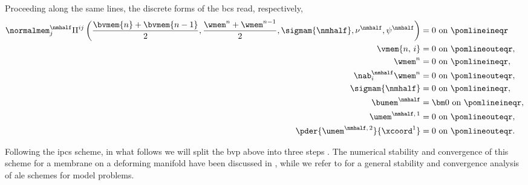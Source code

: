 Proceeding along the same lines, the discrete forms of the \acp{bc} \crefs{\bcsmembrane} read, respectively,
\bw
\begin{align}
    \label{bc_fl_mem_mem_1_disc_bis}
    \normalmem^\nmhalf_j \Pi^{ij}\left( \frac{\bvmem{n} + \bvmem{n-1}}{2},\frac{\wmem^n + \wmem^{n-1}}{2}, \sigmam{\nmhalf}, \nu^\nmhalf, \psi^\nmhalf \right) & = 0 \text{ on } \pomlineineqr        \\
    \label{bc_fl_mem_mem_2_disc_bis}
    \vmem{n, \, i}                                                                                                                                             & = 0 \text{ on } \pomlineouteqr,      \\
    \label{bc_fl_mem_mem_3_disc_bis}
    \wmem^n                                                                                                                                                    & = 0 \text{ on } \pomlineineqr,       \\
    \label{bc_fl_mem_mem_4_disc_bis}
    \nab^\nmhalf_i \wmem^n                                                                                                                                     & = 0 \text{ on } \pomlineouteqr,      \\
    \label{bc_fl_mem_mem_5_disc_bis}
    \sigmam{\nmhalf}                                                                                                                                           & = 0 \text{ on } \pomlineineqr,       \\
    \label{bc_fl_mem_mem_6_disc_bis}
    \bumem^\nmhalf                                                                                                                                             & = {\bm 0} \text{ on } \pomlineineqr, \\
    \label{bc_fl_mem_mem_7_disc_bis}
    \umem^{\nmhalf, \, 1}                                                                                                                                      & = 0 \text{ on } \pomlineouteqr,      \\
    \label{bc_fl_mem_mem_8_disc_bis}
    \pder{\umem^{\nmhalf, \, 2}}{\xcoord^1}                                                                                                                    & = 0 \text{ on } \pomlineouteqr.
\end{align}
\ew


Following the \ac{ipcs} scheme,  in what follows we will split the \ac{bvp} above into three steps  \cite{loggAutomatedSolutionDifferential2012,chorinNumericalSolutionNavierStokes1968}.
The numerical stability and convergence of this scheme for a membrane on a deforming manifold have been discussed in \cite{worthmullerIRENEFluIdLayeR2025}, while we refer to \cite{formaggia1999a,boffi2004stability,sanmartinConvergenceFiniteElement2009} for a general stability and convergence analysis of \ac{ale} schemes for model problems.



